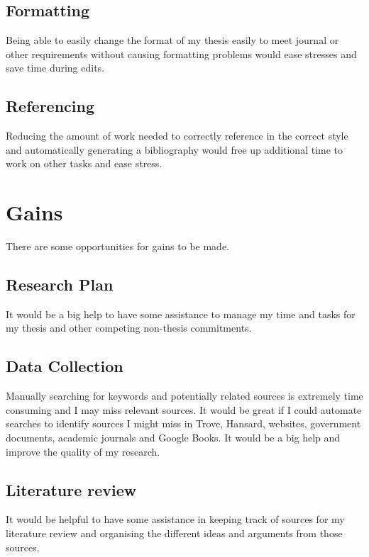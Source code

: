 \documentclass{article}
\begin{document}
\subsection*{Formatting}
Being able to easily change the format of my thesis easily to meet journal or other requirements without causing formatting problems would ease stresses and save time during edits.
\subsection*{Referencing}
Reducing the amount of work needed to correctly reference in the correct style and automatically generating a bibliography would free up additional time to work on other tasks and ease stress.\par

\section*{Gains}

There are some opportunities for gains to be made.
\subsection*{Research Plan}

It would be a big help to have some assistance to manage my time and tasks for my thesis and other competing non-thesis commitments.\par

\par
\subsection*{Data Collection}

Manually searching for keywords and potentially related sources is extremely time consuming and I may miss relevant sources.  It would be great if I could automate searches to identify sources I might miss in Trove, Hansard, websites, government documents, academic journals and Google Books. It would be a big help and improve the quality of my research.


\subsection*{Literature review}

It would be helpful to have some assistance in keeping track of sources for my literature review and organising the different ideas and arguments from those sources.
\end{document}
